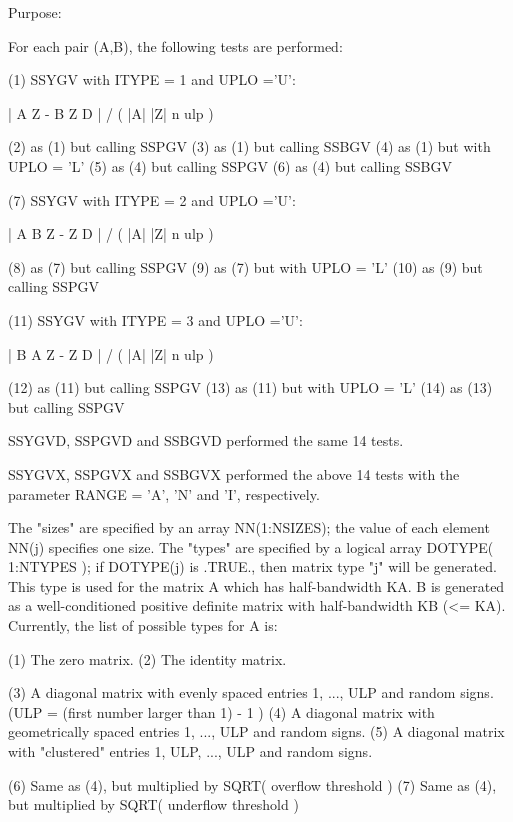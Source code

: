 \begin{DoxyParagraph}{Purpose\+: }
\begin{DoxyVerb}
      For each pair (A,B), the following tests are performed:

      (1) SSYGV with ITYPE = 1 and UPLO ='U':

              | A Z - B Z D | / ( |A| |Z| n ulp )

      (2) as (1) but calling SSPGV
      (3) as (1) but calling SSBGV
      (4) as (1) but with UPLO = 'L'
      (5) as (4) but calling SSPGV
      (6) as (4) but calling SSBGV

      (7) SSYGV with ITYPE = 2 and UPLO ='U':

              | A B Z - Z D | / ( |A| |Z| n ulp )

      (8) as (7) but calling SSPGV
      (9) as (7) but with UPLO = 'L'
      (10) as (9) but calling SSPGV

      (11) SSYGV with ITYPE = 3 and UPLO ='U':

              | B A Z - Z D | / ( |A| |Z| n ulp )

      (12) as (11) but calling SSPGV
      (13) as (11) but with UPLO = 'L'
      (14) as (13) but calling SSPGV

      SSYGVD, SSPGVD and SSBGVD performed the same 14 tests.

      SSYGVX, SSPGVX and SSBGVX performed the above 14 tests with
      the parameter RANGE = 'A', 'N' and 'I', respectively.

      The "sizes" are specified by an array NN(1:NSIZES); the value
      of each element NN(j) specifies one size.
      The "types" are specified by a logical array DOTYPE( 1:NTYPES );
      if DOTYPE(j) is .TRUE., then matrix type "j" will be generated.
      This type is used for the matrix A which has half-bandwidth KA.
      B is generated as a well-conditioned positive definite matrix
      with half-bandwidth KB (<= KA).
      Currently, the list of possible types for A is:

      (1)  The zero matrix.
      (2)  The identity matrix.

      (3)  A diagonal matrix with evenly spaced entries
           1, ..., ULP  and random signs.
           (ULP = (first number larger than 1) - 1 )
      (4)  A diagonal matrix with geometrically spaced entries
           1, ..., ULP  and random signs.
      (5)  A diagonal matrix with "clustered" entries
           1, ULP, ..., ULP and random signs.

      (6)  Same as (4), but multiplied by SQRT( overflow threshold )
      (7)  Same as (4), but multiplied by SQRT( underflow threshold )


\end{DoxyVerb}
\end{DoxyParagraph}
